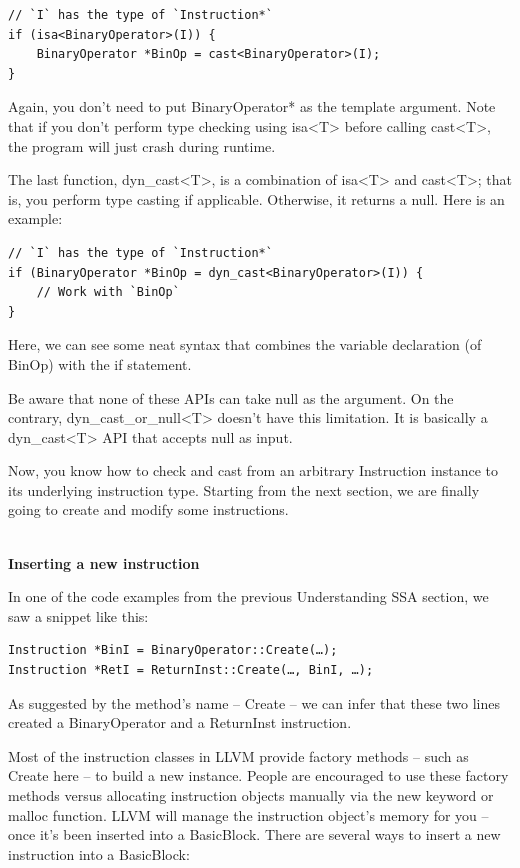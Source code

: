 \begin{lstlisting}[style=styleCXX]
// `I` has the type of `Instruction*`
if (isa<BinaryOperator>(I)) {
	BinaryOperator *BinOp = cast<BinaryOperator>(I);
}
\end{lstlisting}

Again, you don't need to put BinaryOperator* as the template argument. Note that if you don't perform type checking using isa<T> before calling cast<T>, the program will just crash during runtime.

The last function, dyn\_cast<T>, is a combination of isa<T> and cast<T>; that is, you perform type casting if applicable. Otherwise, it returns a null. Here is an example:

\begin{lstlisting}[style=styleCXX]
// `I` has the type of `Instruction*`
if (BinaryOperator *BinOp = dyn_cast<BinaryOperator>(I)) {
	// Work with `BinOp`
}
\end{lstlisting}

Here, we can see some neat syntax that combines the variable declaration (of BinOp) with the if statement.

Be aware that none of these APIs can take null as the argument. On the contrary, dyn\_cast\_or\_null<T> doesn't have this limitation. It is basically a dyn\_cast<T> API that accepts null as input.

Now, you know how to check and cast from an arbitrary Instruction instance to its underlying instruction type. Starting from the next section, we are finally going to create and modify some instructions.

\hspace*{\fill} \\ %
\noindent
\textbf{Inserting a new instruction}

In one of the code examples from the previous Understanding SSA section, we saw a snippet like this:

\begin{lstlisting}[style=styleCXX]
Instruction *BinI = BinaryOperator::Create(…);
Instruction *RetI = ReturnInst::Create(…, BinI, …);
\end{lstlisting}

As suggested by the method's name – Create – we can infer that these two lines created a BinaryOperator and a ReturnInst instruction.

Most of the instruction classes in LLVM provide factory methods – such as Create here – to build a new instance. People are encouraged to use these factory methods versus allocating instruction objects manually via the new keyword or malloc function. LLVM will manage the instruction object's memory for you – once it's been inserted into a BasicBlock. There are several ways to insert a new instruction into a BasicBlock:

